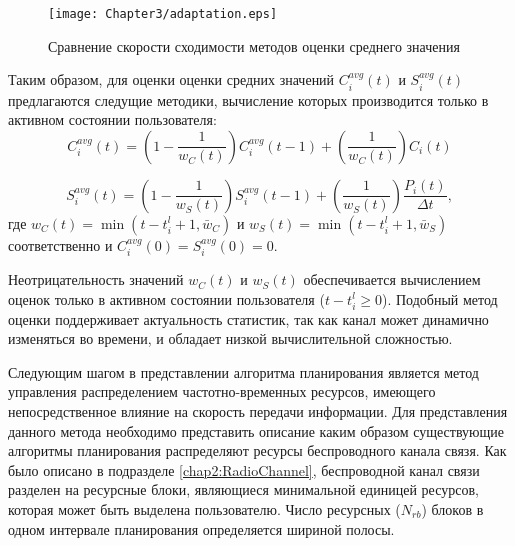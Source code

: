 \begin{figure}[htbp]
\begin{center}
\texttt{[image: Chapter3/adaptation.eps]}
\caption{Сравнение скорости сходимости методов оценки среднего значения}
\label{fig:adaptation}
\end{center}
\end{figure}

Таким образом, для оценки оценки средних значений $C_i^{avg}(t)$ и $S_i^{avg}(t)$ предлагаются следущие методики, вычисление которых производится только в активном состоянии пользователя:
\begin{equation}
\label{eq:CEstimation}
C_i^{avg}(t) = \left(1 - \frac{1}{w_{C}(t)}\right)C_i^{avg}(t - 1) + \left(\frac{1}{w_{C}(t)}\right)C_i(t)
\end{equation}

\begin{equation}
\label{eq:SEstimation}
S_i^{avg}(t) = \left(1 - \frac{1}{w_{S}(t)}\right)S_i^{avg}(t - 1) + \left(\frac{1}{w_{S}(t)}\right)\frac{P_i(t)}{\Delta t},\end{equation}
где $w_{C}(t) = \min (t - t_i^{l} + 1, \bar{w}_{C})$ и $w_{S}(t) = \min (t - t_i^{l} + 1, \bar{w}_{S})$  соответственно и $C_i^{avg}(0) = S_i^{avg}(0) = 0$.

Неотрицательность значений $w_{C}(t)$ и $w_{S}(t)$ обеспечивается вычислением оценок только в активном состоянии пользователя ($t - t_i^{l} \geq 0$). Подобный метод оценки поддерживает актуальность статистик, так как канал может динамично изменяться во времени, и обладает низкой вычислительной сложностью.

Следующим шагом в представлении алгоритма планирования является метод управления распределением частотно-временных ресурсов, имеющего непосредственное влияние на скорость передачи информации. Для представления данного метода необходимо представить описание каким образом существующие алгоритмы планирования распределяют ресурсы беспроводного канала связя. Как было описано в подразделе \ref{chap2:RadioChannel}, беспроводной канал связи разделен на ресурсные блоки, являющиеся минимальной единицей ресурсов, которая может быть выделена пользователю. Число ресурсных ($N_{rb}$) блоков в одном интервале планирования определяется шириной полосы.

